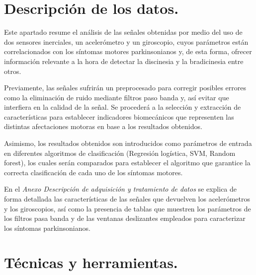 
\section{Descripción de los datos.}

Este apartado resume el análisis de las señales obtenidas por medio del uso de dos sensores inerciales, un acelerómetro y un giroscopio, cuyos parámetros están correlacionados con los síntomas motores parkinsonianos y, de esta forma, ofrecer información relevante a la hora de detectar la discinesia y la bradicinesia entre otros. 

Previamente, las señales sufrirán un preprocesado para corregir posibles errores como la eliminación de ruido mediante filtros paso banda y, así evitar que interfiera en la calidad de la señal. Se procederá a la selección y extracción de características para establecer indicadores biomecánicos que representen las distintas afectaciones motoras en base a los resultados obtenidos.

Asimismo, los resultados obtenidos son introducidos como parámetros de entrada en diferentes algoritmos de clasificación (Regresión logística, SVM, Random forest), los cuales serán comparados para establecer el algoritmo que garantice la correcta clasificación de cada uno de los síntomas motores.


En el \textit{Anexo Descripción de adquisición y tratamiento de datos} se explica de forma detallada las características de las señales que devuelven los acelerómetros y los giroscopios, así como la presencia de tablas que muestren los parámetros de los filtros pasa banda y de las ventanas deslizantes empleados para caracterizar los síntomas parkinsonianos. 
 
\section{Técnicas y herramientas.}



